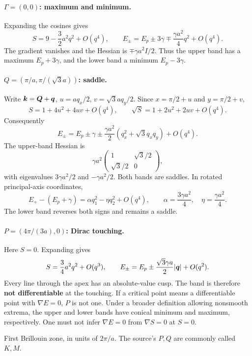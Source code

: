 \paragraph{$\Gamma=(0,0)$: maximum and minimum.}
Expanding the cosines gives
\[
S=9-\frac32a^2q^2+O(q^4),\qquad
E_\pm=E_p\pm3\gamma\mp\frac{\gamma a^2}{4}q^2+O(q^4).
\]
The gradient vanishes and the Hessian is $\mp\gamma a^2I/2$. Thus the upper band has a maximum $E_p+3\gamma$, and the lower band a minimum $E_p-3\gamma$.

\paragraph{$Q=(\pi/a,\pi/(\sqrt3a))$: saddle.}
Write $\boldsymbol{k}=\boldsymbol{Q}+\boldsymbol{q}$, $u=aq_x/2$, $v=\sqrt3aq_y/2$. Since $x=\pi/2+u$ and $y=\pi/2+v$,
\[
S=1+4u^2+4uv+O(q^4),\qquad
\sqrt S=1+2u^2+2uv+O(q^4).
\]
Consequently
\[
E_\pm=E_p\pm\gamma
\pm\frac{\gamma a^2}{2}(q_x^2+\sqrt3q_xq_y)+O(q^4).
\]
The upper-band Hessian is
\[
\gamma a^2\begin{pmatrix}1&\sqrt3/2\\ \sqrt3/2&0\end{pmatrix},
\]
with eigenvalues $3\gamma a^2/2$ and $-\gamma a^2/2$. Both bands are saddles. In rotated principal-axis coordinates,
\[
E_+-(E_p+\gamma)=\alpha q_1^2-\eta q_2^2+O(q^4),\qquad
\alpha=\frac{3\gamma a^2}{4},\quad\eta=\frac{\gamma a^2}{4}.
\]
The lower band reverses both signs and remains a saddle.

\paragraph{$P=(4\pi/(3a),0)$: Dirac touching.}
Here $S=0$. Expanding gives
\[
S=\frac34a^2q^2+O(q^3),\qquad
E_\pm=E_p\pm\frac{\sqrt3\gamma a}{2}|\boldsymbol{q}|+O(q^2).
\]
Every line through the apex has an absolute-value cusp. The band is therefore \textbf{not differentiable} at the touching. If a critical point means a differentiable point with $\nabla E=0$, $P$ is not one. Under a broader definition allowing nonsmooth extrema, the upper and lower bands have conical minimum and maximum, respectively. One must not infer $\nabla E=0$ from $\nabla S=0$ at $S=0$.

\begin{center}

\small First Brillouin zone, in units of $2\pi/a$. The source's $P,Q$ are commonly called $K,M$.
\end{center}

